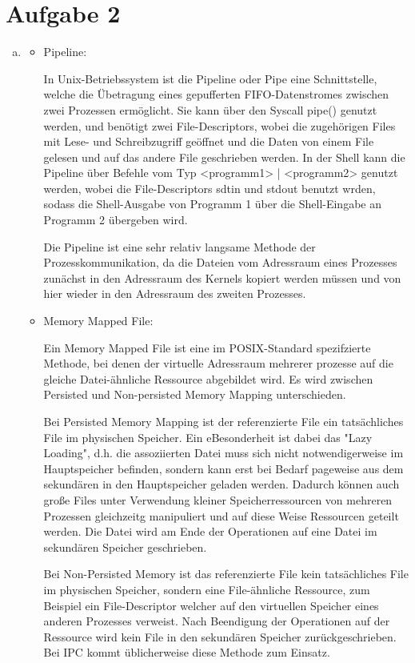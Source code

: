 \documentclass[numbers=noendperiod]{scrartcl}
\begin{document}
\section*{Aufgabe 2}

\begin{enumerate}[a)]
	\item
	\begin{itemize}
		\item Pipeline:
		
		In Unix-Betriebssystem ist die Pipeline oder Pipe eine Schnittstelle, welche die Übetragung eines gepufferten FIFO-Datenstromes zwischen zwei Prozessen ermöglicht.
		Sie kann über den Syscall pipe() genutzt werden, und benötigt zwei File-Descriptors, wobei die zugehörigen Files mit Lese- und Schreibzugriff geöffnet und
		die Daten von einem File gelesen und auf das andere File geschrieben werden. In der Shell kann die Pipeline über Befehle vom Typ <programm1> | <programm2> genutzt werden,
		wobei die File-Descriptors sdtin und stdout benutzt wrden, sodass die Shell-Ausgabe von Programm 1 über die Shell-Eingabe an Programm 2 übergeben wird.
		
		Die Pipeline ist eine sehr relativ langsame Methode der Prozesskommunikation, da die Dateien vom Adressraum eines Prozesses zunächst in den Adressraum des Kernels kopiert werden müssen und von
		hier wieder in den Adressraum des zweiten Prozesses.
		
		\item Memory Mapped File:
		
		Ein Memory Mapped File ist eine im POSIX-Standard spezifzierte Methode, bei denen der virtuelle Adressraum mehrerer prozesse auf die gleiche Datei-ähnliche Ressource abgebildet wird.
		Es wird zwischen Persisted und Non-persisted Memory Mapping unterschieden.
		
		Bei Persisted Memory Mapping ist der referenzierte File ein tatsächliches File im physischen Speicher. Ein eBesonderheit ist dabei das "Lazy Loading", d.h. die assoziierten Datei muss sich
		nicht notwendigerweise im Hauptspeicher befinden, sondern kann erst bei Bedarf pageweise aus dem sekundären in den Hauptspeicher geladen werden. Dadurch können auch große Files unter Verwendung kleiner Speicherressourcen von
		mehreren Prozessen gleichzeitg manipuliert und auf diese Weise Ressourcen geteilt werden. Die Datei wird am Ende der Operationen auf eine Datei im sekundären Speicher geschrieben.
		
		Bei Non-Persisted Memory ist das referenzierte File kein tatsächliches File im physischen Speicher, sondern eine File-ähnliche Ressource, zum Beispiel ein File-Descriptor welcher auf den virtuellen
		Speicher eines anderen Prozesses verweist. Nach Beendigung der Operationen auf der Ressource wird kein File in den sekundären Speicher zurückgeschrieben. Bei IPC kommt üblicherweise diese Methode zum Einsatz.
		

\end{itemize}
\end{enumerate}
\end{document}
